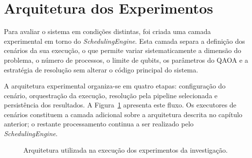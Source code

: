 \section{Arquitetura dos Experimentos}
\label{sec:arquitetura-experimentos}

Para avaliar o sistema em condições distintas, foi criada uma camada experimental em
torno do \textit{SchedulingEngine}. Esta camada separa a definição dos cenários da sua
execução, o que permite variar sistematicamente a dimensão do problema, o número de
processos, o limite de qubits, os parâmetros do QAOA e a estratégia de resolução sem
alterar o código principal do sistema.

A arquitetura experimental organiza-se em quatro etapas: configuração do cenário,
orquestração da execução, resolução pela pipeline selecionada e persistência dos
resultados. A Figura~\ref{fig:fluxo-experimentos} apresenta este fluxo. Os executores de
cenários constituem a camada adicional sobre a arquitetura descrita no capítulo anterior;
o restante processamento continua a ser realizado pelo \textit{SchedulingEngine}.

\begin{figure}[H]
\centering
{}
\caption{Arquitetura utilizada na execução dos experimentos da investigação.}
\label{fig:fluxo-experimentos}
\end{figure}

